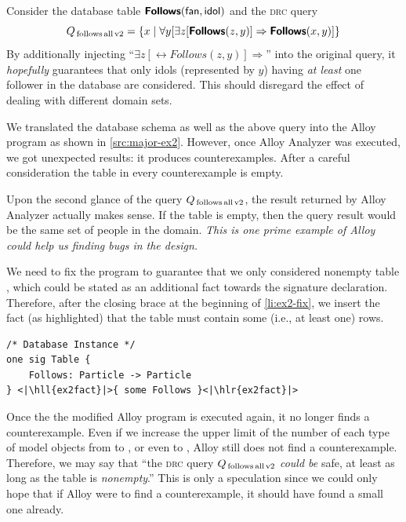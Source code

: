 \newpage
\begin{example}
    \label{ex:major-ex2}
    Consider the database table $\rel{Follows}(\field{fan},\field{idol})$ and the \textsc{drc} query
    \[
        Q_\text{\,follows\,all\,v2} =
            \{ x \mid \forall y[ \exists z [\text{\textnormal{\textsf{\textbf{Follows}}}}(z, y)] \Rightarrow \text{\textnormal{\textsf{\textbf{Follows}}}}(x, y)] \}
    \]
    By additionally injecting ``$\exists z [\rel{Follows}(z, y)] \Rightarrow$'' into the original query, it \emph{hopefully} guarantees that only idols (represented by $y$) having \emph{at least} one follower in the database are considered. This should disregard the effect of dealing with different domain sets.

    We translated the database schema as well as the above query into the Alloy program as shown in \autoref{src:major-ex2}. However, once Alloy Analyzer was executed, we got unexpected results: it produces counterexamples. After a careful consideration the table  in every counterexample is empty.

    Upon the second glance of the query $Q_\text{\,follows\,all\,v2}$, the result returned by Alloy Analyzer actually makes sense. If the table  is empty, then the query result would be the same set of people in the domain. \emph{This is one prime example of Alloy could help us finding bugs in the design.}

    We need to fix the program to guarantee that we only considered nonempty table , which could be stated as an additional fact towards the  signature declaration. Therefore, after the closing brace at the beginning of \autoref{li:ex2-fix}, we insert the fact (as highlighted) that the table  must contain some (i.e., at least one) rows.


\begin{lstlisting}[language=alloy,firstnumber=15]
/* Database Instance */
one sig Table {
    Follows: Particle -> Particle
} <|\hll{ex2fact}|>{ some Follows }<|\hlr{ex2fact}|>
\end{lstlisting}

    Once the the modified Alloy program is executed again, it no longer finds a counterexample. Even if we increase the upper limit of the number of each type of model objects from  to , or even to , Alloy still does not find a counterexample. Therefore, we may say that ``the \textsc{drc} query $Q_\text{\,follows\,all\,v2}$ \emph{could be} safe, at least as long as the table  is \emph{nonempty}.''\; This is only a speculation since we could only hope that if Alloy were to find a counterexample, it should have found a small one already.


\end{example}
